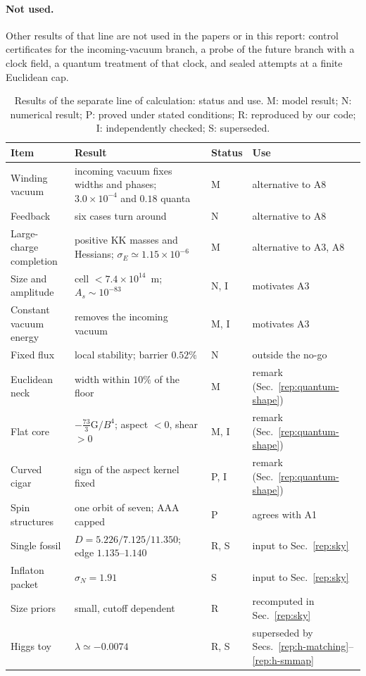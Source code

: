 \paragraph{Not used.}
Other results of that line are not used in the papers or in this report: control certificates for the incoming-vacuum branch, a probe of the future branch with a clock field, a quantum treatment of that clock, and sealed attempts at a finite Euclidean cap.

\begin{table}[t]
\centering
\small
\caption{Results of the separate line of calculation: status and use. M: model result; N: numerical result; P: proved under stated conditions; R: reproduced by our code; I: independently checked; S: superseded.}
\label{tab:v21-summary}
\begin{tabular}{@{}p{}p{}p{}p{}@{}}
\toprule
Item & Result & Status & Use \\
\midrule
Winding vacuum & incoming vacuum fixes widths and phases; $3.0\times10^{-4}$ and $0.18$ quanta & M & alternative to A8 \\
Feedback & six cases turn around & N & alternative to A8 \\
Large-charge completion & positive KK masses and Hessians; $\sigma_E\simeq1.15\times10^{-6}$ & M & alternative to A3, A8 \\
Size and amplitude & cell $<7.4\times10^{14}$~m; $A_s\sim10^{-83}$ & N, I & motivates A3 \\
Constant vacuum energy & removes the incoming vacuum & M, I & motivates A3 \\
Fixed flux & local stability; barrier $0.52\%$ & N & outside the no-go \\
Euclidean neck & width within $10\%$ of the floor & M & remark (Sec.~\ref{rep:quantum-shape}) \\
Flat core & $-\frac{73}{3}\mathrm G/B^4$; aspect $<0$, shear $>0$ & M, I & remark (Sec.~\ref{rep:quantum-shape}) \\
Curved cigar & sign of the aspect kernel fixed & P, I & remark (Sec.~\ref{rep:quantum-shape}) \\
Spin structures & one orbit of seven; AAA capped & P & agrees with A1 \\
Single fossil & $D=5.226/\allowbreak 7.125/\allowbreak 11.350$; edge $1.135$--$1.140$ & R, S & input to Sec.~\ref{rep:sky} \\
Inflaton packet & $\sigma_N=1.91$ & S & input to Sec.~\ref{rep:sky} \\
Size priors & small, cutoff dependent & R & recomputed in Sec.~\ref{rep:sky} \\
Higgs toy & $\lambda\simeq-0.0074$ & R, S & superseded by Secs.~\ref{rep:h-matching}--\ref{rep:h-smmap} \\
\bottomrule
\end{tabular}
\end{table}
